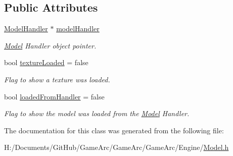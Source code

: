 \subsection*{Public Attributes}
\begin{DoxyCompactItemize}
\item 
\hypertarget{class_model_a25e22dcec702104e4493d8a0cc0b8208}{\hyperlink{class_model_handler}{Model\+Handler} $\ast$ \hyperlink{class_model_a25e22dcec702104e4493d8a0cc0b8208}{model\+Handler}}\label{class_model_a25e22dcec702104e4493d8a0cc0b8208}

\begin{DoxyCompactList}\small\item\em \hyperlink{class_model}{Model} Handler object pointer. \end{DoxyCompactList}\item 
\hypertarget{class_model_a1c0adafee07d69e3d3c87f09bbbb1f47}{bool \hyperlink{class_model_a1c0adafee07d69e3d3c87f09bbbb1f47}{texture\+Loaded} = false}\label{class_model_a1c0adafee07d69e3d3c87f09bbbb1f47}

\begin{DoxyCompactList}\small\item\em Flag to show a texture was loaded. \end{DoxyCompactList}\item 
\hypertarget{class_model_a966cb2bef7912d9cda8884eaa17242b6}{bool \hyperlink{class_model_a966cb2bef7912d9cda8884eaa17242b6}{loaded\+From\+Handler} = false}\label{class_model_a966cb2bef7912d9cda8884eaa17242b6}

\begin{DoxyCompactList}\small\item\em Flag to show the model was loaded from the \hyperlink{class_model}{Model} Handler. \end{DoxyCompactList}\end{DoxyCompactItemize}


The documentation for this class was generated from the following file\+:\begin{DoxyCompactItemize}
\item 
H\+:/\+Documents/\+Git\+Hub/\+Game\+Arc/\+Game\+Arc/\+Game\+Arc/\+Engine/\hyperlink{_model_8h}{Model.\+h}\end{DoxyCompactItemize}
